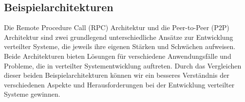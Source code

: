 \documentclass[a4paper]{article}
\begin{document}
\subsection{Beispielarchitekturen}
Die Remote Procedure Call (RPC) Architektur und die Peer-to-Peer (P2P) Architektur sind zwei grundlegend unterschiedliche Ansätze zur Entwicklung verteilter Systeme, die jeweils ihre eigenen Stärken und Schwächen aufweisen. Beide Architekturen bieten Lösungen für verschiedene Anwendungsfälle und Probleme, die in verteilter Systementwicklung auftreten. Durch das Vergleichen dieser beiden Beispielarchitekturen können wir ein besseres Verständnis der verschiedenen Aspekte und Herausforderungen bei der Entwicklung verteilter Systeme gewinnen.



\newpage



\newpage


\newpage




\newpage


\newpage




\renewcommand{\indexname}{Stichwortverzeichnis}
\printindex
\newpage
\printbibliography
\end{document}
